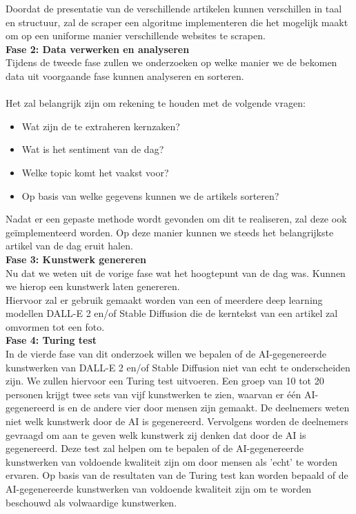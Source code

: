 \noindent
Doordat de presentatie van de verschillende artikelen kunnen verschillen in taal en structuur, zal de scraper een algoritme implementeren die het mogelijk maakt om op een uniforme manier verschillende websites te scrapen. \\

\noindent
\textbf{Fase 2: Data verwerken en analyseren} \\
Tijdens de tweede fase zullen we onderzoeken op welke manier we de bekomen data uit voorgaande fase kunnen analyseren en sorteren. \\ \\
\noindent
Het zal belangrijk zijn om rekening te houden met de volgende vragen: 
\begin{itemize}
    \item Wat zijn de te extraheren kernzaken?
    \item Wat is het sentiment van de dag? 
    \item Welke topic komt het vaakst voor?
    \item Op basis van welke gegevens kunnen we de artikels sorteren? 
\end{itemize}

\noindent
Nadat er een gepaste methode wordt gevonden om dit te realiseren, zal deze ook geïmplementeerd worden. Op deze manier kunnen we steeds het belangrijkste artikel van de dag eruit halen. \\

\noindent
\textbf{Fase 3: Kunstwerk genereren} \\
Nu dat we weten uit de vorige fase wat het hoogtepunt van de dag was. Kunnen we hierop een kunstwerk laten genereren. \\
Hiervoor zal er gebruik gemaakt worden van een of meerdere deep learning modellen DALL-E 2 en/of Stable Diffusion die de kerntekst van een artikel zal omvormen tot een foto. \\

\noindent
\textbf{Fase 4: Turing test} \\ 
In de vierde fase van dit onderzoek willen we bepalen of de AI-gegenereerde kunstwerken van DALL-E 2 en/of Stable Diffusion niet van echt te onderscheiden zijn. We zullen hiervoor een Turing test uitvoeren. Een groep van 10 tot 20 personen krijgt twee sets van vijf kunstwerken te zien, waarvan er één AI-gegenereerd is en de andere vier door mensen zijn gemaakt. De deelnemers weten niet welk kunstwerk door de AI is gegenereerd. Vervolgens worden de deelnemers gevraagd om aan te geven welk kunstwerk zij denken dat door de AI is gegenereerd. Deze test zal helpen om te bepalen of de AI-gegenereerde kunstwerken van voldoende kwaliteit zijn om door mensen als 'echt' te worden ervaren. Op basis van de resultaten van de Turing test kan worden bepaald of de AI-gegenereerde kunstwerken van voldoende kwaliteit zijn om te worden beschouwd als volwaardige kunstwerken.

